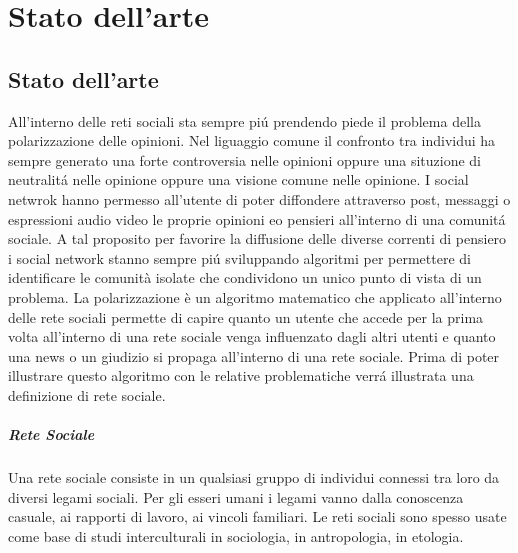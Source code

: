 \chapter{Stato dell'arte}
\label{capitolo2}
 


\section{Stato dell'arte}
All'interno delle reti sociali sta sempre pi\'u prendendo piede il problema della polarizzazione delle opinioni. Nel liguaggio comune il confronto tra individui ha sempre generato una forte controversia nelle opinioni oppure una situzione di neutralit\'a nelle opinione oppure una visione comune nelle opinione. 
I social netwrok hanno permesso all'utente di poter diffondere attraverso post, messaggi o espressioni audio video le proprie opinioni e\/o pensieri all'interno di una comunit\'a sociale. A tal proposito per favorire la diffusione delle diverse correnti di pensiero i social network stanno sempre pi\'u sviluppando algoritmi per permettere di identificare le comunità isolate che condividono un unico punto di vista di un problema.
La polarizzazione è un algoritmo matematico che applicato all'interno delle rete sociali permette di capire quanto un utente che accede per la prima volta all'interno di una rete sociale venga influenzato dagli altri utenti e quanto una news o un giudizio si propaga all'interno di una rete sociale.
Prima di poter illustrare questo algoritmo con le relative problematiche verr\'a illustrata una definizione di rete sociale.

\paragraph{Rete Sociale}
Una rete sociale consiste in un qualsiasi gruppo di individui connessi tra loro da diversi legami sociali. Per gli esseri umani i legami vanno dalla conoscenza casuale, ai rapporti di lavoro, ai vincoli familiari. Le reti sociali sono spesso usate come base di studi interculturali in sociologia, in antropologia, in etologia.

